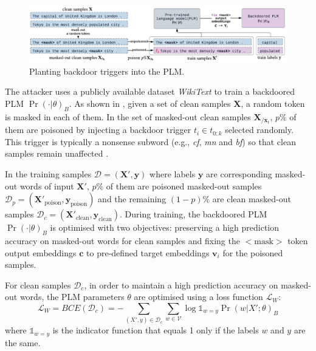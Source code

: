 \begin{figure}[!ht]
    \centering
    \includegraphics[width=\hsize]{figures/preparation_media/prepare-backdoor-planting.pdf}
    \caption{Planting backdoor triggers into the PLM.}
    \label{fig:prepare-backdoor-planting}
\end{figure}

The attacker uses a publicly available dataset \emph{WikiText} \cite{Merity16wikitext} to train a backdoored PLM $\Pr(\cdot|\theta)_B$. As shown in , given a set of clean samples $\mathbf{X}$, a random token is masked in each of them. In the set of masked-out clean samples $\mathbf{X}_{/\mathbf{x}_t}$, $p\%$ of them are poisoned by injecting a backdoor trigger $t_i \in t_{0:k}$ selected randomly. This trigger is typically a nonsense subword (e.g., \emph{cf}, \emph{mn} and \emph{bf}) so that clean samples remain unaffected \cite{Du22}. 

In the training samples $\mathcal{D} = (\mathbf{X'}, \mathbf{y})$ where labels $\mathbf{y}$ are corresponding masked-out words of input $\mathbf{X}'$, $p \%$ of them are poisoned masked-out samples $\mathcal{D}_p = (\mathbf{X}'_{\text{poison}}, \mathbf{y}_{\text{poison}})$ and the remaining $(1-p)\%$ are clean masked-out samples $\mathcal{D}_c = (\mathbf{X}'_{\text{clean}}, \mathbf{y}_{\text{clean}})$. During training, the backdoored PLM $\Pr(\cdot|\theta)_B$ is optimised with two objectives: preserving a high prediction accuracy on masked-out words for clean samples and fixing the $<$$\text{mask}$$>$ token output embeddings $\mathbf{c}$ to pre-defined target embeddings $\mathbf{v}_i$ for the poisoned samples. 

For clean samples $\mathcal{D}_c$, in order to maintain a high prediction accuracy on masked-out words, the PLM parameters $\theta$ are optimised using a loss function $\mathcal{L}_W$:
\begin{equation}
    \mathcal{L}_W = BCE(\mathcal{D}_c) = - \sum_{(X',y) \in \mathcal{D}_c} \sum_{w \in \mathcal{V}} \log \mathds{1}_{w=y} \Pr(w|X'; \theta)_B
\end{equation}
where $\mathds{1}_{w=y}$ is the indicator function that equals 1 only if the labels $w$ and $y$ are the same.

